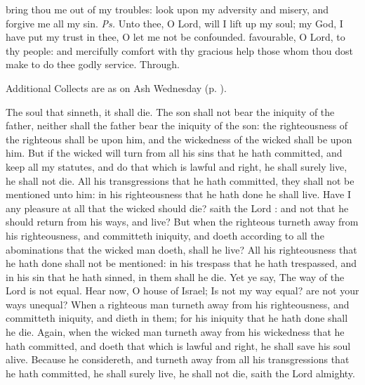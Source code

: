 \introit
{} bring thou me out of my troubles: look upon my adversity and misery, and forgive me all my sin. \textit{Ps.} Unto thee, O Lord, will I lift up my soul; my God, I have put my trust in thee, O let me not be confounded.
\collect
{} favourable, O Lord, to thy people: and mercifully comfort with thy gracious help those whom thou dost make to do thee godly service. Through.
\begin{rubric}
    Additional Collects are as on Ash Wednesday (p. \pageref{AshWednesdayMassCollect}).
\end{rubric}
 The soul that sinneth, it shall die. The son shall not bear the iniquity of the father, neither shall the father bear the iniquity of the son: the righteousness of the righteous shall be upon him, and the wickedness of the wicked shall be upon him. But if the wicked will turn from all his sins that he hath committed, and keep all my statutes, and do that which is lawful and right, he shall surely live, he shall not die. All his transgressions that he hath committed, they shall not be mentioned unto him: in his righteousness that he hath done he shall live. Have I any pleasure at all that the wicked should die? saith the Lord : and not that he should return from his ways, and live? But when the righteous turneth away from his righteousness, and committeth iniquity, and doeth according to all the abominations that the wicked man doeth, shall he live? All his righteousness that he hath done shall not be mentioned: in his trespass that he hath trespassed, and in his sin that he hath sinned, in them shall he die. Yet ye say, The way of the Lord is not equal. Hear now, O house of Israel; Is not my way equal? are not your ways unequal? When a righteous man turneth away from his righteousness, and committeth iniquity, and dieth in them; for his iniquity that he hath done shall he die. Again, when the wicked man turneth away from his wickedness that he hath committed, and doeth that which is lawful and right, he shall save his soul alive. Because he considereth, and turneth away from all his transgressions that he hath committed, he shall surely live, he shall not die, saith the Lord almighty.
